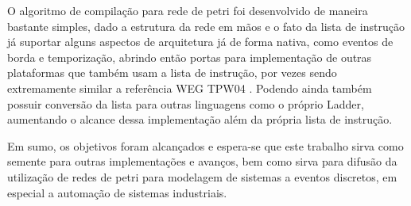 O algoritmo de compilação para rede de petri foi desenvolvido de maneira bastante simples, dado a estrutura da rede em mãos e o fato da lista de instrução já suportar alguns aspectos de arquitetura já de forma nativa, como eventos de borda e temporização, abrindo então portas para implementação de outras plataformas que também usam a lista de instrução, por vezes sendo extremamente similar a referência WEG TPW04 \cite{wegtpw04}. Podendo ainda também possuir conversão da lista para outras linguagens como o próprio Ladder, aumentando o alcance dessa implementação além da própria lista de instrução.

Em sumo, os objetivos foram alcançados e espera-se que este trabalho sirva como semente para outras implementações e avanços, bem como sirva para difusão da utilização de redes de petri para modelagem de sistemas a eventos discretos, em especial a automação de sistemas industriais.